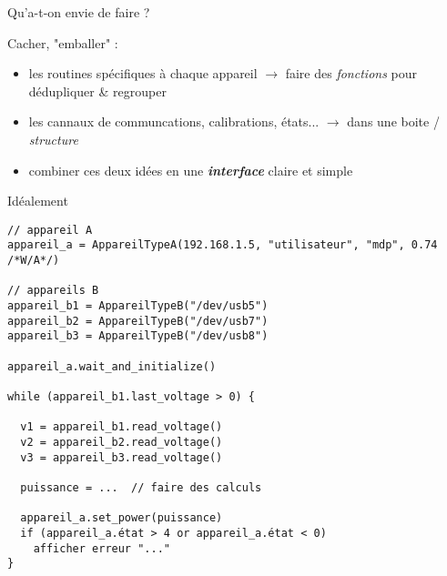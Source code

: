 \documentclass[c]{beamer}
\begin{document}
\begin{frame}[fragile]{Qu'a-t-on envie de faire ?}

\pause
Cacher, "emballer" :
\begin{itemize}[<+->]
  \item les routines spécifiques à chaque appareil $\rightarrow$ faire des \emph{fonctions} pour dédupliquer \& regrouper 
  \item les cannaux de communcations, calibrations, états... $\rightarrow$ dans une boite / \emph{structure}
  \item combiner ces deux idées en une \emph{\textbf{interface}} claire et simple
\end{itemize}

\end{frame}

\begin{frame}[fragile]{Idéalement}

\begin{verbatim}
// appareil A
appareil_a = AppareilTypeA(192.168.1.5, "utilisateur", "mdp", 0.74 /*W/A*/)

// appareils B
appareil_b1 = AppareilTypeB("/dev/usb5")
appareil_b2 = AppareilTypeB("/dev/usb7")
appareil_b3 = AppareilTypeB("/dev/usb8")

appareil_a.wait_and_initialize()

while (appareil_b1.last_voltage > 0) {
  
  v1 = appareil_b1.read_voltage()
  v2 = appareil_b2.read_voltage()
  v3 = appareil_b3.read_voltage()

  puissance = ...  // faire des calculs

  appareil_a.set_power(puissance)
  if (appareil_a.état > 4 or appareil_a.état < 0)
    afficher erreur "..."
}
\end{verbatim}
\end{frame}

\end{document}
